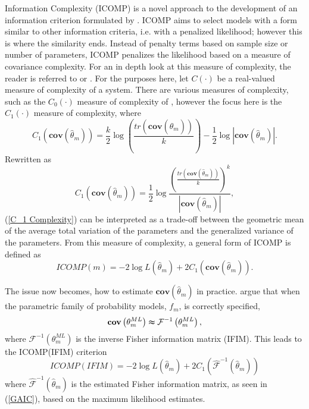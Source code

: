 Information Complexity (ICOMP) is a novel approach to the development
of an information criterion formulated by \citet{Bozd:1988,Bozd:1990}.
ICOMP aims to select models with a form similar to other information
criteria, i.e. with a penalized likelihood; however this is where
the similarity ends. Instead of penalty terms based on sample size
or number of parameters, ICOMP penalizes the likelihood based on a
measure of covariance complexity. For an in depth look at this measure
of complexity, the reader is referred to \citet{vanEmden:1971} or
\citet{Bozd:1990}. For the purposes here, let $C\left(\cdot\right)$
be a real-valued measure of complexity of a system. There are various
measures of complexity, such as the $C_{0}\left(\cdot\right)$ measure
of complexity of \citet{vanEmden:1971}, however the focus here is
the $C_{1}\left(\cdot\right)$ measure of complexity, where
\begin{equation}
C_{1}\left(\mathbf{cov}\left(\hat{\theta}_{m}\right)\right)=\frac{k}{2}\log\left(\frac{tr\left(\mathbf{cov}\left(\hat{\theta}_{m}\right)\right)}{k}\right)-\frac{1}{2}\log\left\vert \mathbf{cov}\left(\hat{\theta}_{m}\right)\right\vert .\label{C_1 Complexity}
\end{equation}
Rewritten as
\[
C_{1}\left(\mathbf{cov}\left(\hat{\theta}_{m}\right)\right)=\frac{1}{2}\log\frac{\left(\frac{tr\left(\mathbf{cov}\left(\hat{\theta}_{m}\right)\right)}{k}\right)^{k}}{\left\vert \mathbf{cov}\left(\hat{\theta}_{m}\right)\right\vert },
\]
(\ref{C_1 Complexity}) can be interpreted as a trade-off between
the geometric mean of the average total variation of the parameters
and the generalized variance of the parameters. From this measure
of complexity, a general form of ICOMP is defined as
\begin{equation}
ICOMP\left(m\right)=-2\log L\left(\hat{\theta}_{m}\right)+2C_{1}\left(\mathbf{cov}\left(\hat{\theta}_{m}\right)\right).\label{ICOMP}
\end{equation}


The issue now becomes, how to estimate $\mathbf{cov}\left(\hat{\theta}_{m}\right)$
in practice. \citet{Bea:Boz:2000} argue that when the parametric
family of probability models, $f_{m}$, is correctly specified,
\[
\mathbf{cov}\left(\theta_{m}^{ML}\right)\thickapprox\mathcal{F}^{-1}\left(\theta_{m}^{ML}\right),
\]
where $\mathcal{F}^{-1}\left(\theta_{m}^{ML}\right)$ is the inverse
Fisher information matrix (IFIM). This leads to the ICOMP(IFIM) criterion
\begin{equation}
ICOMP\left(IFIM\right)=-2\log L\left(\hat{\theta}_{m}\right)+2C_{1}\left(\hat{\mathcal{F}}^{-1}\left(\hat{\theta}_{m}\right)\right)\label{ICOMP(IFIM)}
\end{equation}
where $\hat{\mathcal{F}}^{-1}\left(\hat{\theta}_{m}\right)$ is the
estimated Fisher information matrix, as seen in (\ref{GAIC}), based
on the maximum likelihood estimates.


